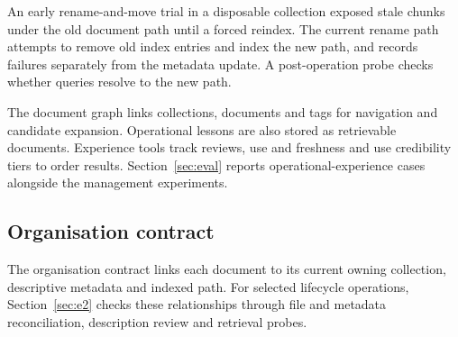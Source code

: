 An early rename-and-move trial in a disposable collection exposed stale
chunks under the old document path until a forced reindex. The current rename
path attempts to remove old index
entries and index the new path, and records failures separately from the
metadata update. A post-operation probe checks whether queries resolve to
the new path.

The document graph links collections, documents and tags for navigation and
candidate expansion. Operational lessons are also stored as retrievable
documents. Experience tools track reviews, use and freshness and use
credibility tiers to order results. Section~\ref{sec:eval} reports
operational-experience cases alongside the management experiments.

\subsection{Organisation contract}
\label{sec:org-integrity}
\label{sec:org-summary}

The organisation contract links each document to its current owning
collection, descriptive metadata and indexed path. For selected lifecycle
operations, Section~\ref{sec:e2} checks these relationships through file
and metadata reconciliation, description review and retrieval probes.
